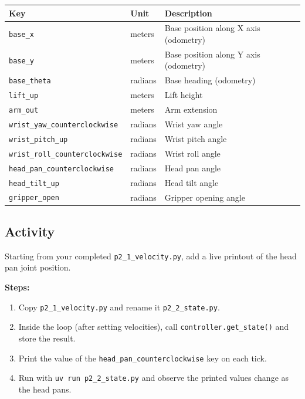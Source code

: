\documentclass[11pt,a4paper]{article}
\begin{document}
\begin{center}
\begin{tabular}{|l|l|l|}
\hline
\textbf{Key} & \textbf{Unit} & \textbf{Description} \\
\hline
\texttt{base\_x} & meters & Base position along X axis (odometry) \\
\texttt{base\_y} & meters & Base position along Y axis (odometry) \\
\texttt{base\_theta} & radians & Base heading (odometry) \\
\hline
\texttt{lift\_up} & meters & Lift height \\
\texttt{arm\_out} & meters & Arm extension \\
\hline
\texttt{wrist\_yaw\_counterclockwise} & radians & Wrist yaw angle \\
\texttt{wrist\_pitch\_up} & radians & Wrist pitch angle \\
\texttt{wrist\_roll\_counterclockwise} & radians & Wrist roll angle \\
\texttt{head\_pan\_counterclockwise} & radians & Head pan angle \\
\texttt{head\_tilt\_up} & radians & Head tilt angle \\
\texttt{gripper\_open} & radians & Gripper opening angle \\
\hline
\end{tabular}
\end{center}

\subsection*{Activity}

Starting from your completed \texttt{p2\_1\_velocity.py}, add a live printout of the head pan joint position.

\textbf{Steps:}
\begin{enumerate}
    \item Copy \texttt{p2\_1\_velocity.py} and rename it \texttt{p2\_2\_state.py}.
    \item Inside the loop (after setting velocities), call \texttt{controller.get\_state()} and store the result.
    \item Print the value of the \texttt{head\_pan\_counterclockwise} key on each tick.
    \item Run with \texttt{uv run p2\_2\_state.py} and observe the printed values change as the head pans.
\end{enumerate}
\end{document}
